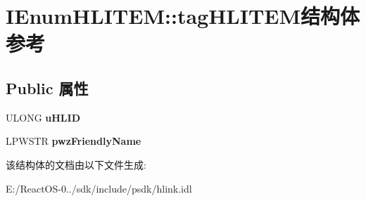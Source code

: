 \hypertarget{struct_i_enum_h_l_i_t_e_m_1_1tag_h_l_i_t_e_m}{}\section{I\+Enum\+H\+L\+I\+T\+EM\+:\+:tag\+H\+L\+I\+T\+E\+M结构体 参考}
\label{struct_i_enum_h_l_i_t_e_m_1_1tag_h_l_i_t_e_m}
\subsection*{Public 属性}
\begin{DoxyCompactItemize}
\item 
\mbox{\label{struct_i_enum_h_l_i_t_e_m_1_1tag_h_l_i_t_e_m_ab9ff78a1e88186c13e3f017cd85052a6}} 
U\+L\+O\+NG {\bfseries u\+H\+L\+ID}
\item 
\mbox{\label{struct_i_enum_h_l_i_t_e_m_1_1tag_h_l_i_t_e_m_a236f94cc9756d574106bf7e85698bc82}} 
L\+P\+W\+S\+TR {\bfseries pwz\+Friendly\+Name}
\end{DoxyCompactItemize}


该结构体的文档由以下文件生成\+:\begin{DoxyCompactItemize}
\item 
E\+:/\+React\+O\+S-\/0../sdk/include/psdk/hlink.\+idl\end{DoxyCompactItemize}
